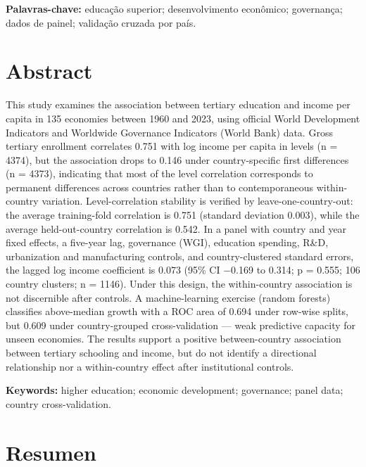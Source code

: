 \documentclass[12pt,a4paper]{article}
\begin{document}
\noindent\textbf{Palavras-chave:} educação superior; desenvolvimento econômico; governança; dados de painel; validação cruzada por país.

\section*{Abstract}

This study examines the association between tertiary education and income per capita in 135 economies between 1960 and 2023, using official World Development Indicators and Worldwide Governance Indicators (World Bank) data. Gross tertiary enrollment correlates 0.751 with log income per capita in levels (n = 4374), but the association drops to 0.146 under country-specific first differences (n = 4373), indicating that most of the level correlation corresponds to permanent differences across countries rather than to contemporaneous within-country variation. Level-correlation stability is verified by leave-one-country-out: the average training-fold correlation is 0.751 (standard deviation 0.003), while the average held-out-country correlation is 0.542. In a panel with country and year fixed effects, a five-year lag, governance (WGI), education spending, R\&D, urbanization and manufacturing controls, and country-clustered standard errors, the lagged log income coefficient is 0.073 (95\% CI $-$0.169 to 0.314; p = 0.555; 106 country clusters; n = 1146). Under this design, the within-country association is not discernible after controls. A machine-learning exercise (random forests) classifies above-median growth with a ROC area of 0.694 under row-wise splits, but 0.609 under country-grouped cross-validation --- weak predictive capacity for unseen economies. The results support a positive between-country association between tertiary schooling and income, but do not identify a directional relationship nor a within-country effect after institutional controls.

\noindent\textbf{Keywords:} higher education; economic development; governance; panel data; country cross-validation.

\section*{Resumen}
\end{document}
